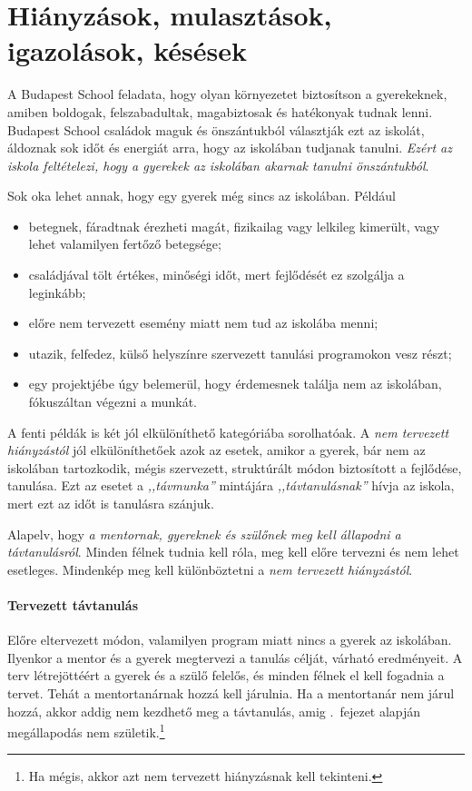 \section{Hiányzások, mulasztások, igazolások, késések}

A Budapest School feladata, hogy olyan környezetet biztosítson a gyerekeknek, amiben boldogak, felszabadultak, magabiztosak és hatékonyak tudnak lenni. Budapest School családok maguk és önszántukból választják ezt az iskolát, áldoznak sok időt és energiát arra, hogy az iskolában tudjanak tanulni. \emph{Ezért az iskola feltételezi, hogy a gyerekek az iskolában akarnak tanulni önszántukból}.

Sok oka lehet annak, hogy egy gyerek még sincs az iskolában. Például
\begin{itemize}
    \item betegnek, fáradtnak érezheti magát, fizikailag vagy lelkileg kimerült, vagy lehet valamilyen fertőző betegsége;
    \item családjával tölt értékes, minőségi időt, mert fejlődését ez szolgálja a leginkább;
    \item előre nem tervezett esemény miatt nem tud az iskolába menni;
    \item utazik, felfedez, külső helyszínre szervezett tanulási programokon vesz részt;
    \item egy projektjébe úgy belemerül, hogy érdemesnek találja nem az iskolában, fóku\-száltan végezni a munkát.
 \end{itemize}

A fenti példák is két jól elkülöníthető kategóriába sorolhatóak. A \emph{nem tervezett hiányzástól} jól elkülöníthetőek azok az esetek, amikor a gyerek, bár nem az iskolában tartozkodik, mégis szervezett, struktúrált módon biztosított a fejlődése, tanulása. Ezt az esetet a \emph{,,távmunka''} mintájára \emph{,,távtanulásnak''} hívja az iskola, mert ezt az időt is tanulásra szánjuk.

Alapelv, hogy \emph{a mentornak, gyereknek és szülőnek meg kell állapodni a távtanulásról}. Minden félnek tudnia kell róla, meg kell előre tervezni és nem lehet esetleges. Mindenkép meg kell különböztetni a \emph{nem tervezett hiányzástól}.

\paragraph{Tervezett távtanulás} Előre eltervezett módon, valamilyen program miatt nincs a gyerek az iskolában. Ilyenkor a mentor és a gyerek megtervezi a tanulás célját, várható eredményeit. A terv létrejöttéért a gyerek és a szülő felelős, és minden félnek el kell fogadnia a tervet. Tehát a mentortanárnak hozzá kell járulnia. Ha a mentortanár nem járul hozzá, akkor addig nem kezdhető meg a távtanulás, amig .~fejezet alapján megállapodás nem születik.\footnote{Ha mégis, akkor azt nem tervezett hiányzásnak kell tekinteni.}

